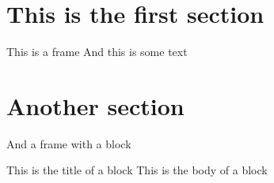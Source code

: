 \documentclass[xcolor=svgnames,compress]{beamer}
\begin{document}

\section{This is the first section}

\begin{frame}{This is a frame}
    And this is some text
\end{frame}

\section{Another section}

\begin{frame}{And a frame with a block}
    \begin{block}{This is the title of a block}
    This is the body of a block 
    \end{block}
\end{frame}
\end{document}
